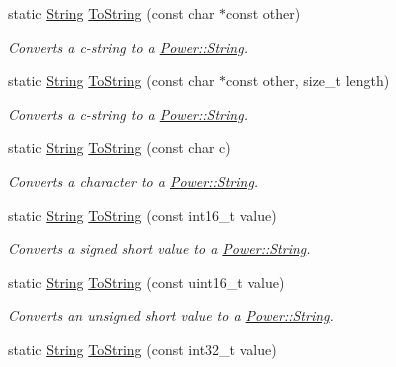 \begin{DoxyCompactItemize}
\item 
static \hyperlink{class_power_1_1_string}{String} \hyperlink{class_power_1_1_string_a8c1588b3f0b9edb49f72ecb3f83e6d8f}{To\+String} (const char $\ast$const other)
\begin{DoxyCompactList}\small\item\em Converts a c-\/string to a \hyperlink{class_power_1_1_string}{Power\+::\+String}. \end{DoxyCompactList}\item 
static \hyperlink{class_power_1_1_string}{String} \hyperlink{class_power_1_1_string_afaa0f16b81fa57e2cf63f319931961aa}{To\+String} (const char $\ast$const other, size\+\_\+t length)
\begin{DoxyCompactList}\small\item\em Converts a c-\/string to a \hyperlink{class_power_1_1_string}{Power\+::\+String}. \end{DoxyCompactList}\item 
static \hyperlink{class_power_1_1_string}{String} \hyperlink{class_power_1_1_string_a0567cc940b3762eb82b1575b42cdb63a}{To\+String} (const char c)
\begin{DoxyCompactList}\small\item\em Converts a character to a \hyperlink{class_power_1_1_string}{Power\+::\+String}. \end{DoxyCompactList}\item 
static \hyperlink{class_power_1_1_string}{String} \hyperlink{class_power_1_1_string_ad2fb9ef1c261109181bfdbe07a99e774}{To\+String} (const int16\+\_\+t value)
\begin{DoxyCompactList}\small\item\em Converts a signed short value to a \hyperlink{class_power_1_1_string}{Power\+::\+String}. \end{DoxyCompactList}\item 
static \hyperlink{class_power_1_1_string}{String} \hyperlink{class_power_1_1_string_a772fcd39002ebfc3bae0a96691bb5d57}{To\+String} (const uint16\+\_\+t value)
\begin{DoxyCompactList}\small\item\em Converts an unsigned short value to a \hyperlink{class_power_1_1_string}{Power\+::\+String}. \end{DoxyCompactList}\item 
static \hyperlink{class_power_1_1_string}{String} \hyperlink{class_power_1_1_string_af88609c608f5996fb997553e5f141bc6}{To\+String} (const int32\+\_\+t value)

\end{DoxyCompactItemize}
